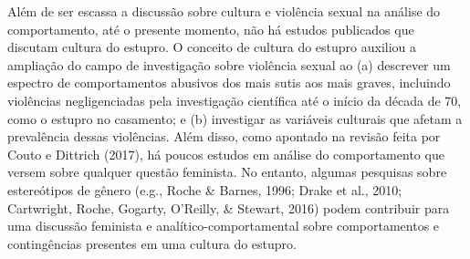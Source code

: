 Além de ser escassa a discussão sobre cultura e violência sexual na análise do comportamento, até o presente momento, não há estudos publicados que discutam cultura do estupro. O conceito de cultura do estupro auxiliou a ampliação do campo de investigação sobre violência sexual ao (a) descrever um espectro de comportamentos abusivos dos mais sutis aos mais graves, incluindo violências negligenciadas pela investigação científica até o início da década de 70, como o estupro no casamento; e (b) investigar as variáveis culturais que afetam a prevalência dessas violências. Além disso, como apontado na revisão feita por Couto e Dittrich (2017), há poucos estudos em análise do comportamento que versem sobre qualquer questão feminista. No entanto, algumas pesquisas sobre estereótipos de gênero (e.g., Roche \& Barnes, 1996; Drake et al., 2010; Cartwright, Roche, Gogarty, O'Reilly, \& Stewart, 2016) podem contribuir para uma discussão feminista e analítico-comportamental sobre comportamentos e contingências presentes em uma cultura do estupro.

